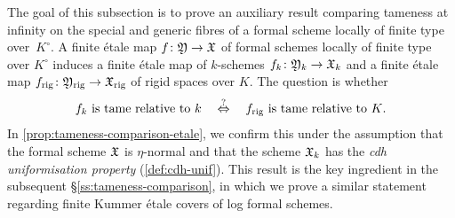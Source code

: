 The goal of this subsection is to prove an auxiliary result comparing tameness at infinity on the special and generic fibres of a formal scheme locally of finite type over~$K^\circ$. A finite \'etale map $f\colon {\mathfrak{Y}}\to {\mathfrak{X}}$ of formal schemes locally of finite type over $K^\circ$ induces a finite \'etale map of $k$-schemes $f_k\colon {\mathfrak{Y}}_k\to {\mathfrak{X}}_k$ and a finite \'etale map $f_{\rm rig}\colon {\mathfrak{Y}}_{\rm rig}\to {\mathfrak{X}}_{\rm rig}$ of rigid spaces over $K$. The question is whether 
\[
    \text{$f_k$ is tame relative to $k$} \quad\overset{?}{\Leftrightarrow}\quad \text{$f_{\rm rig}$ is tame relative to $K$.}
\]
In \cref{prop:tameness-comparison-etale}, we confirm this under the assumption that the formal scheme ${\mathfrak{X}}$ is $\eta$-normal and that the scheme ${\mathfrak{X}}_k$ has the \emph{cdh uniformisation property} (\cref{def:cdh-unif}). This result is the key ingredient in the subsequent \S\ref{ss:tameness-comparison}, in which we prove a similar statement regarding finite Kummer \'etale covers of log formal schemes. 

